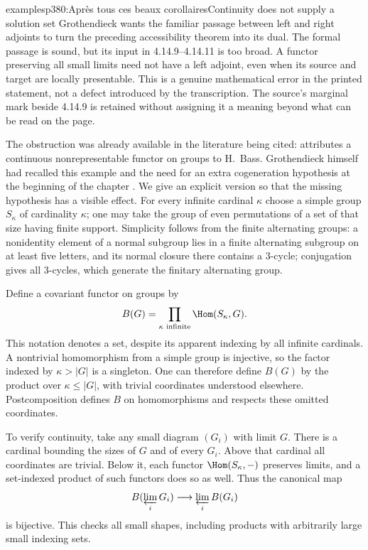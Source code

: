 \begin{dcomment}{examples}{p380:Après tous ces beaux corollaires}{Continuity does not supply a solution set}
Grothendieck wants the familiar passage between left and right adjoints to turn the preceding accessibility theorem into its dual. The formal passage is sound, but its input in 4.14.9--4.14.11 is too broad. A functor preserving all small limits need not have a left adjoint, even when its source and target are locally presentable. This is a genuine mathematical error in the printed statement, not a defect introduced by the transcription. The source's marginal mark beside 4.14.9 is retained without assigning it a meaning beyond what can be read on the page.

The obstruction was already available in the literature being cited: \citet[Expos\'e~I, Example~8.12.9]{SGA4I1972} attributes a continuous nonrepresentable functor on groups to H.~Bass. Grothendieck himself had recalled this example and the need for an extra cogeneration hypothesis at the beginning of the chapter \citep[ms.~50--52]{Grothendieck1990XVIII}. We give an explicit version so that the missing hypothesis has a visible effect. For every infinite cardinal $\kappa$ choose a simple group $S_\kappa$ of cardinality $\kappa$; one may take the group of even permutations of a set of that size having finite support. Simplicity follows from the finite alternating groups: a nonidentity element of a normal subgroup lies in a finite alternating subgroup on at least five letters, and its normal closure there contains a $3$-cycle; conjugation gives all $3$-cycles, which generate the finitary alternating group.

Define a covariant functor on groups by
\[
 B(G)=\prod_{\kappa\text{ infinite}}\Hom(S_\kappa,G).
\]
This notation denotes a set, despite its apparent indexing by all infinite cardinals. A nontrivial homomorphism from a simple group is injective, so the factor indexed by $\kappa>|G|$ is a singleton. One can therefore define $B(G)$ by the product over $\kappa\leq|G|$, with trivial coordinates understood elsewhere. Postcomposition defines $B$ on homomorphisms and respects these omitted coordinates.

To verify continuity, take any small diagram $(G_i)$ with limit $G$. There is a cardinal bounding the sizes of $G$ and of every $G_i$. Above that cardinal all coordinates are trivial. Below it, each functor $\Hom(S_\kappa,-)$ preserves limits, and a set-indexed product of such functors does so as well. Thus the canonical map
\[
 B(\varprojlim_iG_i)\longrightarrow\varprojlim_iB(G_i)
\]
is bijective. This checks all small shapes, including products with arbitrarily large small indexing sets.


\end{dcomment}
